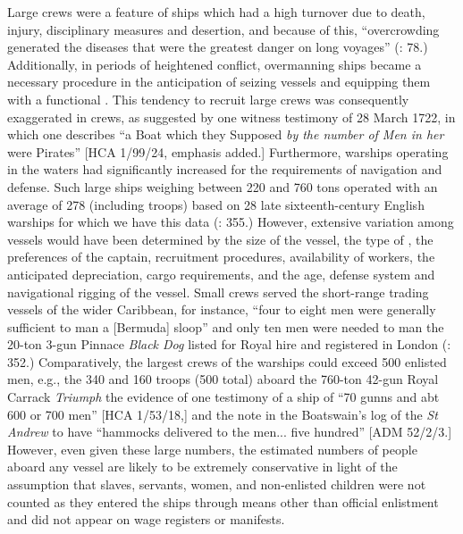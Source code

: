 Large crews were a feature of ships which had a high  turnover due to death, injury, disciplinary measures and desertion, and because of this, “overcrowding generated the diseases that were the greatest danger on long voyages” (\citealt{Bicheno2012}: 78.) Additionally, in periods of heightened conflict, overmanning ships became a necessary procedure in the anticipation of seizing vessels and equipping them with a functional . This tendency to recruit large crews was consequently exaggerated in  crews, as suggested by one witness testimony of 28 March {1722}, in which one  describes “a Boat which they Supposed \textit{by the number of Men in her} were Pirates” [HCA 1/99/24, emphasis added.] Furthermore, warships operating in the  waters had significantly increased  for the requirements of navigation and defense. Such large ships weighing between 220 and 760 tons operated with an average  of 278 (including troops) based on 28 late sixteenth-century English warships for which we have this data (\citealt{Bicheno2012}: 355.) However, extensive variation among vessels would have been determined by the size of the vessel, the type of , the preferences of the captain, recruitment procedures, availability of workers, the anticipated  depreciation, cargo requirements, and the age, defense system and navigational rigging of the vessel. Small crews served the short-range trading vessels of the wider Caribbean, for instance, “four to eight men were generally sufficient to man a [Bermuda] sloop” \citep[123]{Jarvis2010} and only ten men were needed to man the 20-ton 3-gun Pinnace \textit{Black Dog} listed for Royal hire and registered in London (\citealt{Bicheno2012}: 352.) Comparatively, the largest crews of the warships could exceed 500 enlisted men, e.g., the 340  and 160 troops (500 total) aboard the 760-ton 42-gun Royal Carrack \textit{Triumph} \citep[355,]{Bicheno2012} the evidence of one testimony of a ship of “70 gunns and abt 600 or 700 men” [HCA 1/53/18,] and the note in the Boatswain’s log of the \textit{St Andrew} to have “hammocks delivered to the men... five hundred” [ADM 52/2/3.] However, even given these large  numbers, the estimated numbers of people aboard any vessel are likely to be extremely conservative in light of the assumption that slaves, servants, women, and non-enlisted children were not counted as they entered the ships through means other than official enlistment and did not appear on wage registers or  manifests. 

